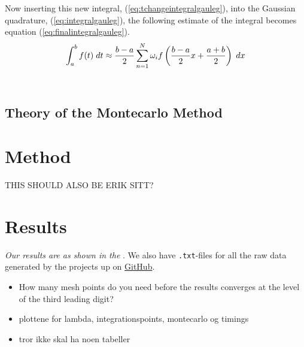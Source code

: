 \documentclass{article}
\begin{document}
Now inserting this new integral, (\ref{eq:tchangeintegralgauleg}), into the Gaussian quadrature, (\ref{eq:integralgauleg}), the following estimate of the integral becomes equation (\ref{eq:finalintegralgauleg}). \\

\begin{equation} \label{eq:finalintegralgauleg}
    \int_{a}^{b} f(t) \hspace{1mm} dt \approx \frac{b-a}{2} \sum_{n=1}^{N} \omega_i f \left( \frac{b-a}{2}x + \frac{a+b}{2} \right) \hspace{1mm} dx
\end{equation} \\

\subsection{Theory of the Montecarlo Method}


\vspace{1cm}

\section{Method} \label{sec:Method}


THIS SHOULD ALSO BE ERIK SITT?

\vspace{1cm}

\section{Results} \label{sec:Results}

  \textit{Our results are as shown in the }. We also have \texttt{.txt}-files for all the raw data generated by the projects up on \href{https://github.com/Erikbgram/Fys3150}{GitHub}. \\

\begin{itemize}

  \item How many mesh points do you need before the results converges at the level of the third leading digit?

  \item plottene for lambda, integrationspoints, montecarlo og timings

  \item tror ikke skal ha noen tabeller

\end{itemize}
\end{document}
